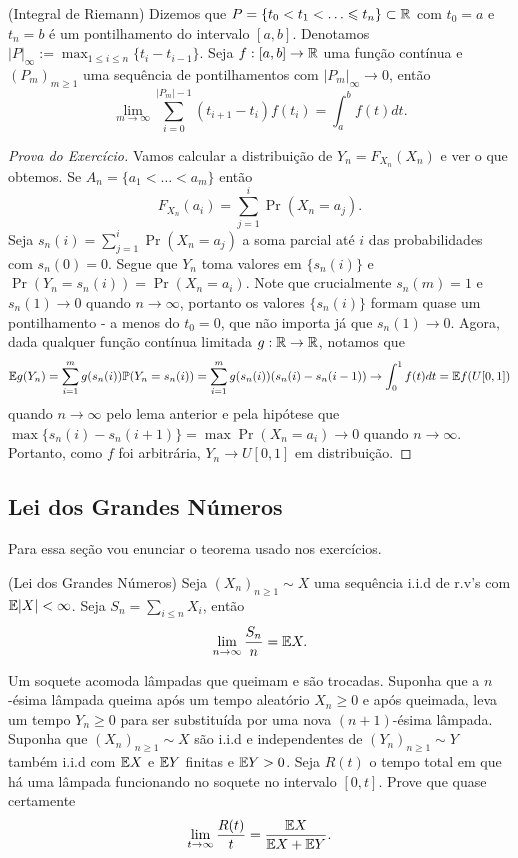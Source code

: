 \begin{lemma}
	(Integral de Riemann) Dizemos que $P = \{t_0 < t_1 <\dots \leq t_n\}
	\subset \R$ com $t_0 = a$ e $t_n = b$ é
	um pontilhamento do intervalo $[a,b]$. Denotamos $|P|_\infty :=
	\max_{1 \leq i \leq n} \{t_{i} - t_{i-1}\}$. Seja $f : [a,b] \rightarrow \mathbb{R}$
	uma função contínua e $(P_m)_{m\geq 1}$  uma sequência de
	pontilhamentos com $|P_m|_\infty \to 0$, então
	\[
		\lim_{m \to \infty} \sum_{i = 0}^{|P_m| - 1} (t_{i+1} - t_i)f(t_i)
		= \int_a^b f(t) dt.
	\]
\end{lemma}

\begin{proof}[Prova do Exercício] Vamos calcular a distribuição de
	$Y_n = F_{X_n}(X_n)$ e ver o que obtemos. Se $A_n = \{a_1 < \dots < a_m\}$
	então
	\[
		F_{X_n}(a_i) = \sum_{j = 1}^i \Pr(X_n = a_j).
	\]
	Seja $s_n(i) = \sum_{j = 1}^i \Pr(X_n = a_j)$ a soma parcial até $i$
	das probabilidades com $s_n(0) = 0$. Segue que $Y_n$ toma valores em
	$\{s_n(i)\}$
	e $\Pr(Y_n = s_n(i)) = \Pr(X_n = a_i)$. Note que crucialmente
	$s_n(m) = 1$ e $s_n(1) \to 0$ quando $n \to \infty$, portanto
	os valores $\{s_n(i)\}$ formam quase um pontilhamento - a menos do
	$t_0 = 0$, que não importa já que $s_n(1)\to 0$. Agora, dada
	qualquer função contínua
	limitada $g : \mathbb{R} \rightarrow \mathbb{R}$, notamos que
	\[
		\mathbb{E} g(Y_n) = \sum_{i = 1}^m g(s_n(i))\mathbb{P}(Y_n = s_n(i)) = \sum_{i =
		1}^m g(s_n(i)) (s_n(i) - s_n(i - 1)) \rightarrow \int_0^1 f(t) dt = \mathbb{E} f(U[0,1])
	\]
	quando $n \to \infty$ pelo lema anterior e pela hipótese que $\max
	\{s_n(i) - s_n(i+1)\} = \max \Pr(X_n = a_i) \to 0$ quando $n \to \infty$.
	Portanto, como $f$ foi arbitrária, $Y_n \to U[0,1]$ em distribuição.

\end{proof}


\subsection{Lei dos Grandes Números}
Para essa seção vou enunciar o teorema usado nos exercícios.
\begin{theorem}
	\label{trm:large_numbers}
	(Lei dos Grandes Números) Seja $(X_n)_{n\geq 1} \sim X$ uma
	sequência i.i.d de r.v's com $\mathbb{E} |X| < \infty$. Seja $S_n = \sum_{i
	\leq n} X_i$, então
	\[
		\lim_{n \rightarrow \infty} \frac{S_n}{n} = \mathbb{E} X.
	\]
\end{theorem}

\begin{exercise}
	Um soquete acomoda lâmpadas que  queimam e são trocadas. Suponha que
	a $n$-ésima lâmpada queima após um tempo aleatório $X_n \geq 0$ e
	após queimada, leva um tempo $Y_n \geq 0$ para ser substituída por
	uma nova $(n+1)$-ésima lâmpada. Suponha que $(X_n)_{n\geq1} \sim X$ são i.i.d e
	independentes de $(Y_n)_{n\geq 1} \sim Y$ também i.i.d com $\mathbb{E} X$ e
	$\mathbb{E} Y$ finitas e $\mathbb{E} Y > 0$. Seja $R(t)$ o tempo total em que há
	uma lâmpada funcionando
	no soquete no intervalo $[0,t]$. Prove que quase certamente
	\[
		\lim_{t \rightarrow \infty} \frac{R(t)}{t} = \frac{\mathbb{E} X}{ \mathbb{E} X + \mathbb{E} Y}.
	\]
\end{exercise}

